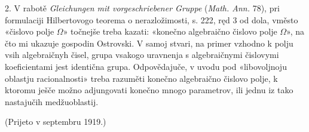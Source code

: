 \documentclass[11pt]{article}
\begin{document}
2. V rabotě \emph{Gleichungen mit vorgeschriebener Gruppe} (\emph{Math. Ann.} 78), pri formulaciji Hilbertovogo teorema o nerazložimosti, s. 222, ręd 3 od dola, vměsto «čislovo polje \(\Omega\)» točnejše treba kazati: «konečno algebraično čislovo polje \(\Omega\)», na čto mi ukazuje gospodin Ostrovski. V samoj stvari, na primer vzhodno k polju vsih algebraičnyh čisel, grupa vsakogo uravnenja s algebraičnymi čislovymi koeficientami jest identična grupa. Odpovědajuče, v uvodu pod «libovoljnoju oblastju racionalnosti» treba razuměti konečno algebraično čislovo polje, k ktoromu ješče možno adjungovati konečno mnogo parametrov, ili jednu iz tako nastajučih medžuoblastij.

\begin{center}
(Prijeto v septembru 1919.)
\end{center}
\end{document}
